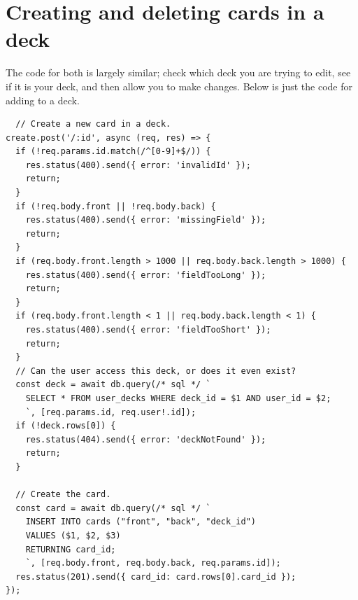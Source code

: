 \documentclass{report}
\begin{document}
\section{Creating and deleting cards in a deck}

The code for both is largely similar; check which deck you are trying to edit, see if it is your deck, and then allow you to make changes. Below is just the code for adding to a deck.

\begin{verbatim}
  // Create a new card in a deck.
create.post('/:id', async (req, res) => {
  if (!req.params.id.match(/^[0-9]+$/)) {
    res.status(400).send({ error: 'invalidId' });
    return;
  }
  if (!req.body.front || !req.body.back) {
    res.status(400).send({ error: 'missingField' });
    return;
  }
  if (req.body.front.length > 1000 || req.body.back.length > 1000) {
    res.status(400).send({ error: 'fieldTooLong' });
    return;
  }
  if (req.body.front.length < 1 || req.body.back.length < 1) {
    res.status(400).send({ error: 'fieldTooShort' });
    return;
  }
  // Can the user access this deck, or does it even exist?
  const deck = await db.query(/* sql */ `
    SELECT * FROM user_decks WHERE deck_id = $1 AND user_id = $2;
    `, [req.params.id, req.user!.id]);
  if (!deck.rows[0]) {
    res.status(404).send({ error: 'deckNotFound' });
    return;
  }

  // Create the card.
  const card = await db.query(/* sql */ `
    INSERT INTO cards ("front", "back", "deck_id")
    VALUES ($1, $2, $3)
    RETURNING card_id;
    `, [req.body.front, req.body.back, req.params.id]);
  res.status(201).send({ card_id: card.rows[0].card_id });
});
\end{verbatim}
\end{document}
